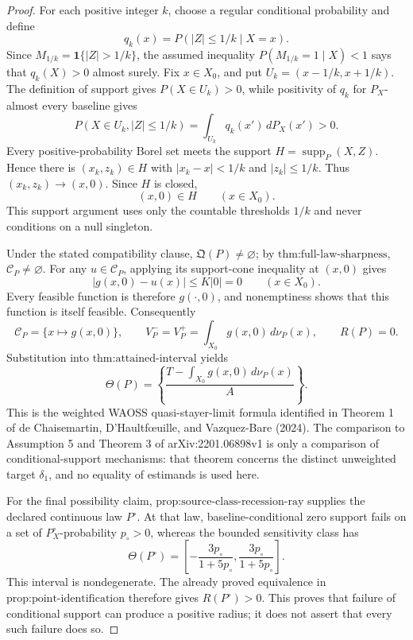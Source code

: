 \documentclass{article}
\begin{document}
\begin{proof}
For each positive integer \(k\), choose a regular conditional probability and define
\[
 q_k(x)=P(|Z|\leq 1/k\mid X=x).
\]
Since \(M_{1/k}=\mathbf 1\{|Z|>1/k\}\), the assumed inequality \(P(M_{1/k}=1\mid X)<1\) says that \(q_k(X)>0\) almost surely.  Fix \(x\in X_0\), and put \(U_k=(x-1/k,x+1/k)\).  The definition of support gives \(P(X\in U_k)>0\), while positivity of \(q_k\) for \(P_X\)-almost every baseline gives
\[
 P(X\in U_k,|Z|\leq1/k)
 =\int_{U_k}q_k(x')\,dP_X(x')>0.
\]
Every positive-probability Borel set meets the support \(H=\operatorname{supp}_P(X,Z)\).  Hence there is \((x_k,z_k)\in H\) with \(|x_k-x|<1/k\) and \(|z_k|\leq1/k\).  Thus \((x_k,z_k)\to(x,0)\).  Since \(H\) is closed,
\[
 (x,0)\in H\qquad(x\in X_0).
\]
This support argument uses only the countable thresholds \(1/k\) and never conditions on a null singleton.

Under the stated compatibility clause, \(\mathfrak Q(P)\neq\varnothing\); by \(\text{thm:full-law-sharpness}\), \(\mathcal C_P\neq\varnothing\).  For any \(u\in\mathcal C_P\), applying its support-cone inequality at \((x,0)\) gives
\[
 |g(x,0)-u(x)|\leq K|0|=0
 \qquad(x\in X_0).
\]
Every feasible function is therefore \(g(\cdot,0)\), and nonemptiness shows that this function is itself feasible.  Consequently
\[
 \mathcal C_P=\{x\mapsto g(x,0)\},
 \qquad
 V_P^-=V_P^+=\int_{X_0}g(x,0)\,d\nu_P(x),
 \qquad
 R(P)=0.
\]
Substitution into \(\text{thm:attained-interval}\) yields
\[
 \Theta(P)=
 \left\{\frac{T-\int_{X_0}g(x,0)\,d\nu_P(x)}{A}\right\}.
\]
This is the weighted WAOSS quasi-stayer-limit formula identified in Theorem 1 of de Chaisemartin, D'Haultf\oe{}uille, and Vazquez-Bare (2024).  The comparison to Assumption 5 and Theorem 3 of arXiv:2201.06898v1 is only a comparison of conditional-support mechanisms: that theorem concerns the distinct unweighted target \(\delta_1\), and no equality of estimands is used here.

For the final possibility claim, \(\text{prop:source-class-recession-ray}\) supplies the declared continuous law \(P^{\circ}\).  At that law, baseline-conditional zero support fails on a set of \(P_X^{\circ}\)-probability \(p_{\circ}>0\), whereas the bounded sensitivity class has
\[
 \Theta(P^{\circ})=
 \left[-\frac{3p_{\circ}}{1+5p_{\circ}},
        \frac{3p_{\circ}}{1+5p_{\circ}}\right].
\]
This interval is nondegenerate.  The already proved equivalence in \(\text{prop:point-identification}\) therefore gives \(R(P^{\circ})>0\).  This proves that failure of conditional support can produce a positive radius; it does not assert that every such failure does so.
\end{proof}
\end{document}
